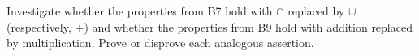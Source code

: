 Investigate whether the properties from B7 hold with $\cap$ replaced by $\cup$ (respectively, $+$) and whether the properties from B9 hold with addition replaced by multiplication. Prove or disprove each analogous assertion.
